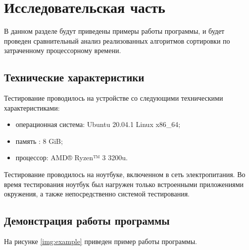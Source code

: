 \chapter{Исследовательская часть}

В данном разделе будут приведены примеры работы программы, и будет проведен сравнительный анализ реализованных алгоритмов сортировки по затраченному процессорному времени.

\section{Технические характеристики}

Тестирование проводилось на устройстве со следующими техническими характеристиками:

\begin{itemize}
	\item операционная система: Ubuntu 20.04.1 Linux x86\_64;
	\item память : 8 GiB;
	\item процессор: AMD® Ryzen™ 3 3200u.
\end{itemize}

Тестирование проводилось на ноутбуке, включенном в сеть электропитания. Во время тестирования ноутбук был нагружен только встроенными приложениями окружения, а также непосредственно системой тестирования.

\clearpage

\section{Демонстрация работы программы}

На рисунке \ref{img:example} приведен пример работы программы.

